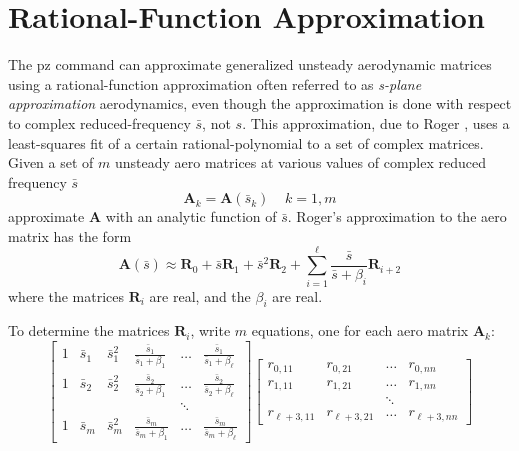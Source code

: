 \documentclass[11pt,openany,twoside]{book}
\numberwithin{equation}{section}		%
\newcommand{\Cmd}[1]{{\sf #1}}
\newcommand{\Newterm}[1]{{\em #1}}
\newcommand{\Matrix}[1]{\boldsymbol{#1}}
\begin{document}
\section{Rational-Function Approximation}\label{sect:rfa-theory}
\par
{}
The \Cmd{pz} command can approximate generalized
unsteady aerodynamic matrices using a rational-function
approximation often referred to as \Newterm{s-plane approximation}
aerodynamics, even though the approximation is done
with respect to complex reduced-frequency $\bar{s}$, not $s$.
This approximation, due to Roger \cite{roger1977airplane},
uses a least-squares fit of a certain rational-polynomial
to a set of complex matrices. Given a set of $m$
unsteady aero matrices at various values of complex
reduced frequency $\bar{s}$ 
\begin{equation}
\Matrix{A}_k = \Matrix{A}(\bar{s}_k) \; \; \; \; k = 1, m
\end{equation}
approximate $\Matrix{A}$ with an analytic function of $\bar{s}$.
Roger's approximation to the aero matrix has the form
\begin{equation}
  \Matrix{A}(\bar{s}) \approx \Matrix{R}_0 + \bar{s}\Matrix{R}_1 + \bar{s}^2 \Matrix{R}_2 +  \sum_{i=1}^{\ell} \frac{\bar{s}}{\bar{s} + \beta_i} \Matrix{R}_{i+2}
\end{equation}
where the matrices $\Matrix{R}_i$ are real, and the $\beta_i$ are real.
\par
To determine the matrices $\Matrix{R}_i$, write $m$ equations, one for each
aero matrix $\Matrix{A}_k$:
\begin{displaymath}
\left[
\begin{array}{cccccc}
1 & \bar{s}_1 & \bar{s}_1^2 & \frac{\bar{s}_1}{\bar{s}_1 + \beta_1} & \ldots & \frac{\bar{s}_1}{\bar{s}_1 + \beta_{\ell}} \\
1 & \bar{s}_2 & \bar{s}_2^2 & \frac{\bar{s}_2}{\bar{s}_2 + \beta_1} & \ldots & \frac{\bar{s}_2}{\bar{s}_2 + \beta_{\ell}} \\
  &     &       &                           & \ddots &                           \\
1 & \bar{s}_m & \bar{s}_m^2 & \frac{\bar{s}_m}{\bar{s}_m + \beta_1} & \ldots & \frac{\bar{s}_m}{\bar{s}_m + \beta_{\ell}}
\end{array}
\right]
\left[
\begin{array}{cccc}
r_{0,11}   & r_{0,21}   & \ldots & r_{0,nn} \\
r_{1,11}   & r_{1,21}   & \ldots & r_{1,nn} \\
           &            & \ddots &          \\
r_{\ell+3,11} & r_{\ell+3,21} & \ldots & r_{\ell+3,nn}
\end{array}
\right]
\end{displaymath}
\end{document}

